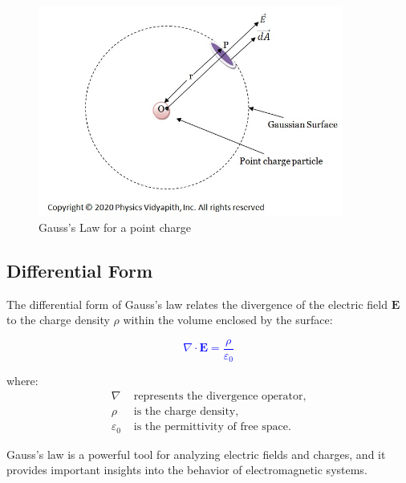\documentclass{article}
\begin{document}
\begin{figure}[h]
    \centering
    \includegraphics[width=10cm]{Electric Field Due to point charge particle_gauss law.jpg}
    \caption{Gauss's Law for a point charge}
    \label{fig:Gauss's Law}
\end{figure}

\subsection*{Differential Form}

The differential form of Gauss's law \cite{inbook} relates the divergence of the electric field $\mathbf{E}$ to the charge density $\rho$ within the volume enclosed by the surface:

\textcolor{blue}{\[
\nabla \cdot \mathbf{E} = \frac{\rho}{\varepsilon_0}
\]}

where:
\begin{align*}
\nabla & \text{ represents the divergence operator}, \\
\rho & \text{ is the charge density}, \\
\varepsilon_0 & \text{ is the permittivity of free space}.
\end{align*}

Gauss's law is a powerful tool for analyzing electric fields and charges, and it provides important insights into the behavior of electromagnetic systems.


\end{document}
